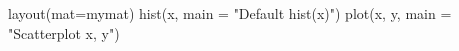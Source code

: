 \begin{Schunk}
\begin{Sinput}
 layout(mat=mymat)
 hist(x, main = "Default hist(x)")
 plot(x, y, main = "Scatterplot x, y")
\end{Sinput}
\end{Schunk}
